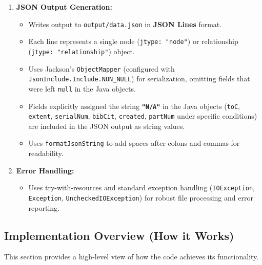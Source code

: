 \begin{enumerate}
    \item \textbf{JSON Output Generation:}
        \begin{itemize}
            \item Writes output to \texttt{output/data.json} in \textbf{JSON Lines} format.
            \item Each line represents a single node (\texttt{jtype: "node"}) or relationship (\texttt{jtype: "relationship"}) object.
            \item Uses Jackson's \texttt{ObjectMapper} (configured with \texttt{JsonInclude.Include.NON\_NULL}) for serialization, omitting fields that were left \texttt{null} in the Java objects.
            \item Fields explicitly assigned the string \textbf{\texttt{"N/A"}} in the Java objects (\texttt{toC}, \texttt{extent}, \texttt{serialNum}, \texttt{bibCit}, \texttt{created}, \texttt{partNum} under specific conditions) are included in the JSON output as string values.
            \item Uses \texttt{formatJsonString} to add spaces after colons and commas for readability.
        \end{itemize}

    \item \textbf{Error Handling:}
        \begin{itemize}
            \item Uses try-with-resources and standard exception handling (\texttt{IOException}, \texttt{Exception}, \texttt{UncheckedIOException}) for robust file processing and error reporting.
        \end{itemize}
\end{enumerate}

\subsection{Implementation Overview (How it Works)}
This section provides a high-level view of how the code achieves its functionality.


